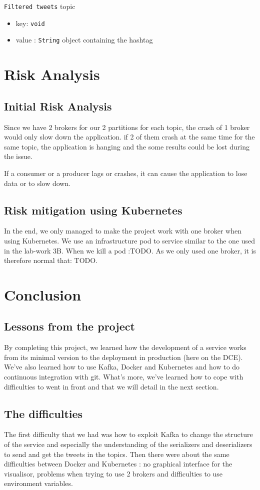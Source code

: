 \documentclass[10pt,a4paper]{article}
\begin{document}
\texttt{Filtered tweets} topic
\begin{itemize}
    \item key: \texttt{void}
    \item value : \texttt{String} object containing the hashtag
\end{itemize}

\section{Risk Analysis}
\subsection{Initial Risk Analysis}
\qquad Since we have 2 brokers for our 2 partitions for each topic, the crash of 1 broker would only slow down the application. if 2 of them crash at the same time for the same topic, the application is hanging and the some results could be lost during the issue.

If a consumer or a producer lags or crashes, it can cause the application to lose data or to slow down.
\subsection{Risk mitigation using Kubernetes}
\qquad In the end, we only managed to make the project work with one broker when using Kubernetes. We use an infrastructure pod to service similar to the one used in the lab-work 3B. When we kill a pod :TODO. As we only used one broker, it is therefore normal that: TODO.

\section{Conclusion}
\subsection{Lessons from the project}
\qquad By completing this project, we learned how the development of a service works from its minimal version to the deployment in production (here on the DCE). We've also learned how to use Kafka, Docker and Kubernetes and how to do continuous integration with git. What's more, we've learned how to cope with difficulties to went in front and that we will detail in the next section.
\subsection{The difficulties}
\qquad The first difficulty that we had was how to exploit Kafka to change the structure of the service and especially the understanding of the serializers and deserializers to send and get the tweets in the topics. Then there were about the same difficulties between Docker and Kubernetes : no graphical interface for the visualisor, problems when trying to use 2 brokers and difficulties to use environment variables.
\end{document}
